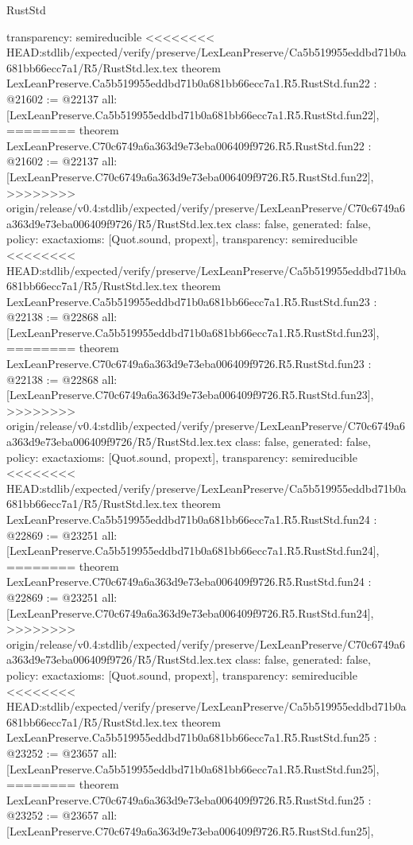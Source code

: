 \begin{lexlean}{RustStd}
\begin{coremodule}
{\begin{coremodule}
{{{{{{{{{{{{{{{{{{{{{{{{{  transparency: semireducible
}
<<<<<<<< HEAD:stdlib/expected/verify/preserve/LexLeanPreserve/Ca5b519955eddbd71b0a681bb66ecc7a1/R5/RustStd.lex.tex
theorem LexLeanPreserve.Ca5b519955eddbd71b0a681bb66ecc7a1.R5.RustStd.fun22 : @21602 := @22137 {
  all: [LexLeanPreserve.Ca5b519955eddbd71b0a681bb66ecc7a1.R5.RustStd.fun22],
========
theorem LexLeanPreserve.C70c6749a6a363d9e73eba006409f9726.R5.RustStd.fun22 : @21602 := @22137 {
  all: [LexLeanPreserve.C70c6749a6a363d9e73eba006409f9726.R5.RustStd.fun22],
>>>>>>>> origin/release/v0.4:stdlib/expected/verify/preserve/LexLeanPreserve/C70c6749a6a363d9e73eba006409f9726/R5/RustStd.lex.tex
  class: false,
  generated: false,
  policy: exact{axioms: [Quot.sound, propext]},
  transparency: semireducible
}
<<<<<<<< HEAD:stdlib/expected/verify/preserve/LexLeanPreserve/Ca5b519955eddbd71b0a681bb66ecc7a1/R5/RustStd.lex.tex
theorem LexLeanPreserve.Ca5b519955eddbd71b0a681bb66ecc7a1.R5.RustStd.fun23 : @22138 := @22868 {
  all: [LexLeanPreserve.Ca5b519955eddbd71b0a681bb66ecc7a1.R5.RustStd.fun23],
========
theorem LexLeanPreserve.C70c6749a6a363d9e73eba006409f9726.R5.RustStd.fun23 : @22138 := @22868 {
  all: [LexLeanPreserve.C70c6749a6a363d9e73eba006409f9726.R5.RustStd.fun23],
>>>>>>>> origin/release/v0.4:stdlib/expected/verify/preserve/LexLeanPreserve/C70c6749a6a363d9e73eba006409f9726/R5/RustStd.lex.tex
  class: false,
  generated: false,
  policy: exact{axioms: [Quot.sound, propext]},
  transparency: semireducible
}
<<<<<<<< HEAD:stdlib/expected/verify/preserve/LexLeanPreserve/Ca5b519955eddbd71b0a681bb66ecc7a1/R5/RustStd.lex.tex
theorem LexLeanPreserve.Ca5b519955eddbd71b0a681bb66ecc7a1.R5.RustStd.fun24 : @22869 := @23251 {
  all: [LexLeanPreserve.Ca5b519955eddbd71b0a681bb66ecc7a1.R5.RustStd.fun24],
========
theorem LexLeanPreserve.C70c6749a6a363d9e73eba006409f9726.R5.RustStd.fun24 : @22869 := @23251 {
  all: [LexLeanPreserve.C70c6749a6a363d9e73eba006409f9726.R5.RustStd.fun24],
>>>>>>>> origin/release/v0.4:stdlib/expected/verify/preserve/LexLeanPreserve/C70c6749a6a363d9e73eba006409f9726/R5/RustStd.lex.tex
  class: false,
  generated: false,
  policy: exact{axioms: [Quot.sound, propext]},
  transparency: semireducible
}
<<<<<<<< HEAD:stdlib/expected/verify/preserve/LexLeanPreserve/Ca5b519955eddbd71b0a681bb66ecc7a1/R5/RustStd.lex.tex
theorem LexLeanPreserve.Ca5b519955eddbd71b0a681bb66ecc7a1.R5.RustStd.fun25 : @23252 := @23657 {
  all: [LexLeanPreserve.Ca5b519955eddbd71b0a681bb66ecc7a1.R5.RustStd.fun25],
========
theorem LexLeanPreserve.C70c6749a6a363d9e73eba006409f9726.R5.RustStd.fun25 : @23252 := @23657 {
  all: [LexLeanPreserve.C70c6749a6a363d9e73eba006409f9726.R5.RustStd.fun25],
}}}}}}}}}}}}}}}}}}}}}}}}}}}}}
\end{coremodule}}
\end{coremodule}
\end{lexlean}
